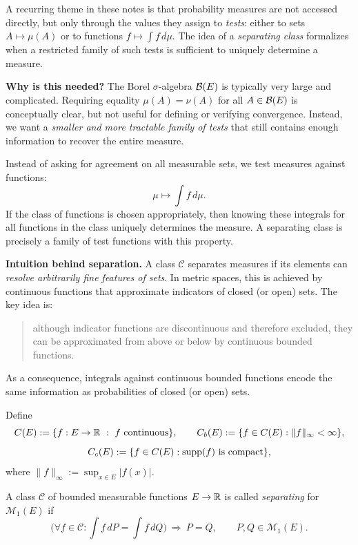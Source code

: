 A recurring theme in these notes is that probability measures are not accessed directly,
but only through the values they assign to \emph{tests}:
either to sets $A\mapsto \mu(A)$ or to functions $f\mapsto \int f\,d\mu$.
The idea of a \emph{separating class} formalizes when a restricted family of such tests
is sufficient to uniquely determine a measure.

\medskip

\noindent
\textbf{Why is this needed?}
The Borel $\sigma$-algebra $\mathcal{B}(E)$ is typically very large and complicated.
Requiring equality $\mu(A)=\nu(A)$ for all $A\in\mathcal{B}(E)$ is conceptually clear,
but not useful for defining or verifying convergence.
Instead, we want a \emph{smaller and more tractable family of tests}
that still contains enough information to recover the entire measure.

\medskip

Instead of asking for agreement on all measurable sets,
we test measures against functions:
\[
\mu \longmapsto \int f\,d\mu .
\]
If the class of functions is chosen appropriately, then knowing these integrals
for all functions in the class uniquely determines the measure.
A separating class is precisely a family of test functions with this property.

\medskip

\noindent
\textbf{Intuition behind separation.}
A class $\mathcal{C}$ separates measures if its elements can
\emph{resolve arbitrarily fine features of sets}.
In metric spaces, this is achieved by continuous functions that approximate indicators
of closed (or open) sets.
The key idea is:
\begin{quote}
although indicator functions are discontinuous and therefore excluded,
they can be approximated from above or below by continuous bounded functions.
\end{quote}
As a consequence, integrals against continuous bounded functions
encode the same information as probabilities of closed (or open) sets.

\begin{definition}
Define
\[
C(E):=\{f:E\to\mathbb{R} \ :\ f \text{ continuous}\},\qquad
C_b(E):=\{f\in C(E): \|f\|_\infty<\infty\},
\]
\[
C_c(E):=\{f\in C(E): \operatorname{supp}(f) \text{ is compact}\},
\]
where $\|f\|_\infty:=\sup_{x\in E}|f(x)|$.
\end{definition}

\begin{definition}
A class $\mathcal{C}$ of bounded measurable functions $E\to\mathbb{R}$ is called \emph{separating} for $\mathcal{M}_1(E)$ if
\[
\Big(\forall f\in\mathcal{C}: \int f\,dP=\int f\,dQ\Big)\ \Longrightarrow\ P=Q,
\qquad P,Q\in\mathcal{M}_1(E).
\]
\end{definition}

